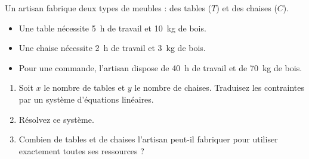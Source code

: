 \documentclass[11pt]{article}
\begin{document}
\begin{exercice}
Un artisan fabrique deux types de meubles : des tables ($T$) et des chaises ($C$).
\begin{itemize}
    \item Une table nécessite \SI{5}{\hour} de travail et \SI{10}{\kilogram} de bois.
    \item Une chaise nécessite \SI{2}{\hour} de travail et \SI{3}{\kilogram} de bois.
    \item Pour une commande, l'artisan dispose de \SI{40}{\hour} de travail et de \SI{70}{\kilogram} de bois.
\end{itemize}
\begin{enumerate}
    \item Soit $x$ le nombre de tables et $y$ le nombre de chaises. Traduisez les contraintes par un système d'équations linéaires.
    \item Résolvez ce système.
    \item Combien de tables et de chaises l'artisan peut-il fabriquer pour utiliser exactement toutes ses ressources ?
\end{enumerate}
\end{exercice}
\end{document}
